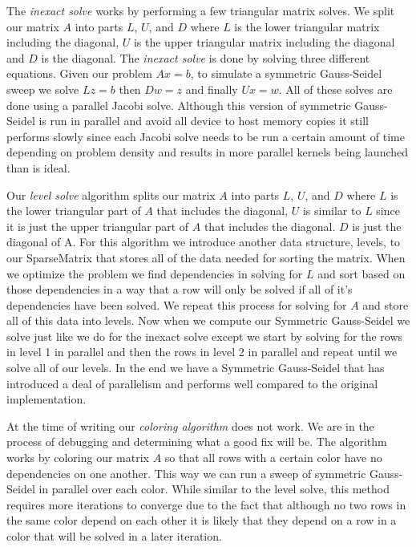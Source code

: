 \documentclass{ccr15}
\begin{document}
The \emph{inexact solve} works by performing a few triangular matrix solves. We split our matrix $A$ into
parts $L$, $U$, and $D$ where $L$ is the lower triangular matrix including the diagonal, $U$ is the upper
triangular matrix including the diagonal and $D$ is the diagonal. The \emph{inexact solve} is done by solving three
different equations. Given our problem $A x = b$, to simulate a symmetric Gauss-Seidel sweep we solve
$L z = b$ then $D w = z$ and finally $U x = w$. All of these solves are done using a parallel Jacobi solve.
Although this version of symmetric Gauss-Seidel is run in parallel and avoid all device to host memory
copies it still performs slowly since each Jacobi solve needs to be run a certain amount of time depending
on problem density and results in more parallel kernels being launched than is ideal.

Our \emph{level solve} algorithm splits our matrix $A$ into parts $L$, $U$, and $D$ where $L$ is the
lower triangular part of $A$ that includes the diagonal, $U$ is similar to $L$ since it is just
the upper triangular part of $A$ that includes the diagonal. $D$ is just the diagonal of A. For
this algorithm we introduce another data structure, levels, to our SparseMatrix that stores all 
of the data needed for sorting the matrix. When we optimize the problem we find dependencies in
solving for $L$ and sort based on those dependencies in a way that a row will only be solved if
all of it's dependencies have been solved. We repeat this process for solving for $A$ and store
all of this data into levels. Now when we compute our Symmetric Gauss-Seidel we solve just like
we do for the inexact solve except we start by solving for the rows in level 1 in parallel and
then the rows in level 2 in parallel and repeat until we solve all of our levels. In the end we
have a Symmetric Gauss-Seidel that has introduced a deal of parallelism and performs well
compared to the original implementation.

At the time of writing our \emph{coloring algorithm} does not work. We are in the process of debugging and
determining what a good fix will be. The algorithm works by coloring our matrix $A$ so that all rows
with a certain color have no dependencies on one another. This way we can run a sweep of symmetric
Gauss-Seidel in parallel over each color. While similar to the level solve, this method requires more iterations
to converge due to the fact that although no two rows in the same color depend on each other it is likely
that they depend on a row in a color that will be solved in a later iteration.
\end{document}
